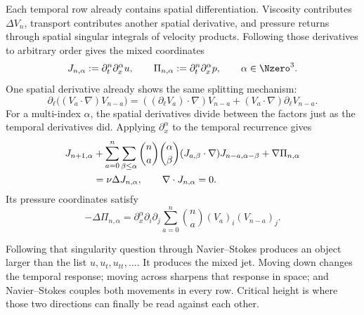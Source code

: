 Each temporal row already contains spatial differentiation.  Viscosity contributes \(\Delta V_n\), transport contributes another spatial derivative, and pressure returns through spatial singular integrals of velocity products.  Following those derivatives to arbitrary order gives the mixed coordinates
\begin{equation}\label{eq:BodyMixedJetDefinition}
  J_{n,\alpha}:=\partial_t^n\partial_x^\alpha u,
  \qquad
  \Pi_{n,\alpha}:=\partial_t^n\partial_x^\alpha p,
  \qquad
  \alpha\in\Nzero^3.
\end{equation}
One spatial derivative already shows the same splitting mechanism:
\[
  \partial_\ell\bigl((V_a\cdot\nabla)V_{n-a}\bigr)
  =((\partial_\ell V_a)\cdot\nabla)V_{n-a}
  +(V_a\cdot\nabla)\partial_\ell V_{n-a}.
\]
For a multi-index \(\alpha\), the spatial derivatives divide between the factors just as the temporal derivatives did.  Applying \(\partial_x^\alpha\) to the temporal recurrence gives
\begin{align}
  J_{n+1,\alpha}
  &+
  \sum_{a=0}^{n}
  \sum_{\beta\leq\alpha}
  \binom{n}{a}\binom{\alpha}{\beta}
  (J_{a,\beta}\cdot\nabla)
  J_{n-a,\alpha-\beta}
  +\nabla\Pi_{n,\alpha}
  \notag\\
  &=
  \nu\Delta J_{n,\alpha},
  \qquad
  \nabla\cdot J_{n,\alpha}=0.
  \label{eq:BodyMixedJetRecurrence}
\end{align}
Its pressure coordinates satisfy
\begin{equation}\label{eq:BodyMixedPressureRecurrence}
  -\Delta\Pi_{n,\alpha}
  =
  \partial_x^\alpha\partial_i\partial_j
  \sum_{a=0}^{n}\binom{n}{a}
  (V_a)_i(V_{n-a})_j.
\end{equation}

Following that singularity question through Navier--Stokes produces an object larger than the list \(u,u_t,u_{tt},\ldots\).  It produces the mixed jet.  Moving down changes the temporal response; moving across sharpens that response in space; and Navier--Stokes couples both movements in every row.  Critical height is where those two directions can finally be read against each other.

